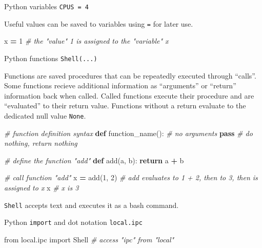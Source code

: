 \documentclass[
]{book}
\newenvironment{Shaded}{\begin{snugshade}}{\end{snugshade}}
\newcommand{\CommentTok}[1]{\textcolor[rgb]{0.56,0.35,0.01}{\textit{#1}}}
\newcommand{\ControlFlowTok}[1]{\textcolor[rgb]{0.13,0.29,0.53}{\textbf{#1}}}
\newcommand{\DecValTok}[1]{\textcolor[rgb]{0.00,0.00,0.81}{#1}}
\newcommand{\ImportTok}[1]{#1}
\newcommand{\KeywordTok}[1]{\textcolor[rgb]{0.13,0.29,0.53}{\textbf{#1}}}
\newcommand{\NormalTok}[1]{#1}
\newcommand{\OperatorTok}[1]{\textcolor[rgb]{0.81,0.36,0.00}{\textbf{#1}}}
\begin{document}
Python variables \texttt{CPUS\ =\ 4}

Useful values can be saved to variables using \texttt{=} for later use.

\begin{Shaded}
\begin{Highlighting}[numbers=left,,]
\NormalTok{x }\OperatorTok{=} \DecValTok{1} \CommentTok{\# the "value" 1 is assigned to the "variable" x}
\end{Highlighting}
\end{Shaded}

Python functions \texttt{Shell(...)}

Functions are saved procedures that can be repeatedly executed through ``calls''.
Some functions recieve additional information as ``arguments'' or ``return'' information back when called.
Called functions execute their procedure and are ``evaluated'' to their return value.
Functions without a return evaluate to the dedicated null value \texttt{None}.

\begin{Shaded}
\begin{Highlighting}[numbers=left,,]
\CommentTok{\# function definition syntax}
\KeywordTok{def}\NormalTok{ function\_name(): }\CommentTok{\# no arguments}
    \ControlFlowTok{pass} \CommentTok{\# do nothing, return nothing}

\CommentTok{\# define the function "add"}
\KeywordTok{def}\NormalTok{ add(a, b):}
    \ControlFlowTok{return}\NormalTok{ a }\OperatorTok{+}\NormalTok{ b}

\CommentTok{\# call function "add"}
\NormalTok{x }\OperatorTok{=}\NormalTok{ add(}\DecValTok{1}\NormalTok{, }\DecValTok{2}\NormalTok{) }\CommentTok{\# add evaluates to 1 + 2, then to 3, then is assigned to x}
\NormalTok{x }\CommentTok{\# x is 3}
\end{Highlighting}
\end{Shaded}

\texttt{Shell} accepts text and executes it as a bash command.

Python \texttt{import} and dot notation \texttt{local.ipc}

\begin{Shaded}
\begin{Highlighting}[numbers=left,,]
\ImportTok{from}\NormalTok{ local.ipc }\ImportTok{import}\NormalTok{ Shell }\CommentTok{\# access "ipc" from "local"}
\end{Highlighting}
\end{Shaded}
\end{document}
